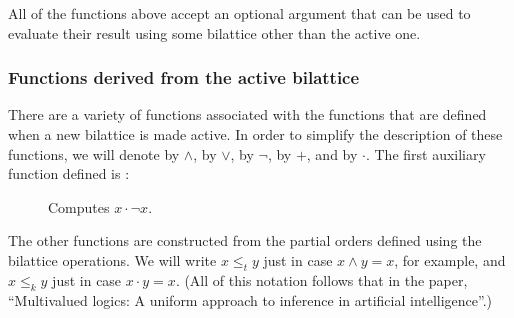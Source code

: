 All of the functions above accept an optional argument that can be
used to evaluate their result using some bilattice other than the
active one.

\subsubsection{Functions derived from the active bilattice}

There are a variety of functions associated with the functions that
are defined when a new bilattice is made active.  In order to
simplify the description of these functions, we will denote
 by $\wedge$,  by $\vee$, 
by $\neg$,  by $+$, and  by $\cdot$.
The first auxiliary function defined is :
 \begin{description}
 \item [] Computes $x\cdot \neg x$.
 \end{description}

The other functions are constructed from the partial orders defined
using the bilattice operations.  We will write $x\leq_t y$ just in
case $x\wedge y = x$, for example, and $x\leq_k y$ just in case
$x\cdot y = x$.  (All of this notation follows that in the paper,
``Multivalued logics: A uniform approach to inference in artificial
intelligence''.)

